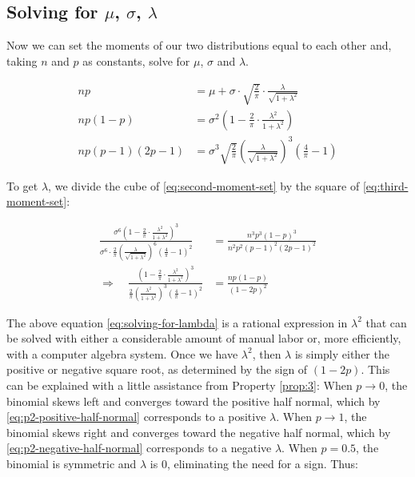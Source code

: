 \documentclass{article}
\begin{document}
\subsection{Solving for $\mu$, $\sigma$, $\lambda$}

Now we can set the moments of our two distributions equal to each other and,
taking $n$ and $p$ as constants, solve for $\mu$, $\sigma$ and $\lambda$.

\begin{subequations}
\begin{align}
  np &= \mu + \sigma \cdot \sqrt{\frac{2}{\pi}} \cdot \frac{\lambda}{\sqrt{1 + \lambda^2}} \label{eq:first-moment-set} \\
  np(1-p) &= \sigma^2 \left( 1 - \frac{2}{\pi} \cdot \frac{\lambda^2}{1 + \lambda^2} \right) \label{eq:second-moment-set} \\
  np(p-1)(2p-1) &= \sigma^3 \sqrt{\frac{2}{\pi}} \left( \frac{\lambda}{\sqrt{1 + \lambda^2}} \right)^3 \left( \frac{4}{\pi} - 1 \right) \label{eq:third-moment-set}
\end{align}
\end{subequations}

To get $\lambda$, we divide the cube of \eqref{eq:second-moment-set} by the
square of \eqref{eq:third-moment-set}:

\begin{align}
  \frac{\sigma^6 \left( 1 - \frac{2}{\pi} \cdot \frac{\lambda^2}{1 + \lambda^2} \right)^3}{\sigma^6 \cdot \frac{2}{\pi} \left( \frac{\lambda}{\sqrt{1 + \lambda^2}} \right)^6 \left(
    \frac{4}{\pi} - 1 \right)^2} &= \frac{n^3p^3(1-p)^3}{n^2p^2(p-1)^2(2p-1)^2} \nonumber \\
  \Rightarrow \quad \frac{\left( 1 - \frac{2}{\pi} \cdot \frac{\lambda^2}{1+\lambda^2} \right)^3}{\frac{2}{\pi} \left( \frac{\lambda^2}{1+\lambda^2} \right)^3 \left( \frac{4}{\pi} - 1
    \right)^2} &= \frac{np(1-p)}{(1-2p)^2} \label{eq:solving-for-lambda}
\end{align}

The above equation \eqref{eq:solving-for-lambda} is a rational expression in
$\lambda^2$ that can be solved with either a considerable amount of manual
labor or, more efficiently, with a computer algebra system. Once we have
$\lambda^2$, then $\lambda$ is simply either the positive or negative square
root, as determined by the sign of $(1-2p)$. This can be explained with a
little assistance from Property \ref{prop:3}: When $p \to 0$, the binomial
skews left and converges toward the positive half normal, which by
\eqref{eq:p2-positive-half-normal} corresponds to a positive $\lambda$. When $p
\to 1$, the binomial skews right and converges toward the negative half normal,
which by \eqref{eq:p2-negative-half-normal} corresponds to a negative
$\lambda$. When $p = 0.5$, the binomial is symmetric and $\lambda$ is 0,
eliminating the need for a sign. Thus:
\end{document}
